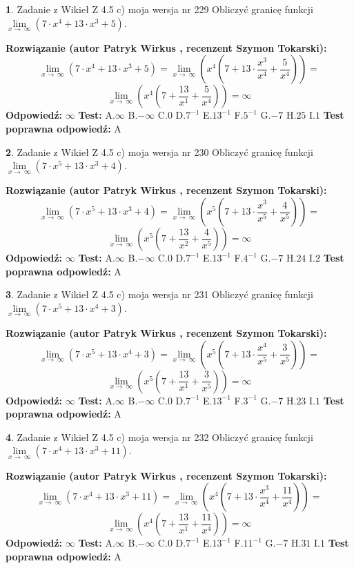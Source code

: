 \documentclass[12pt, a4paper]{article}
\theoremstyle{definition} %
\newtheorem{zad}{}
\newcommand{\zadStart}[1]{\begin{zad}#1\newline}
\newcommand{\zadStop}{\end{zad}}
\newcommand{\rozwStart}[2]{\noindent \textbf{Rozwiązanie (autor #1 , recenzent #2): }\newline}
\newcommand{\rozwStop}{\newline}
\newcommand{\odpStart}{\noindent \textbf{Odpowiedź:}\newline}
\newcommand{\odpStop}{\newline}
\newcommand{\testStart}{\noindent \textbf{Test:}\newline}
\newcommand{\testStop}{\newline}
\newcommand{\kluczStart}{\noindent \textbf{Test poprawna odpowiedź:}\newline}
\newcommand{\kluczStop}{\newline}
\begin{document}
\zadStart{Zadanie z Wikieł Z 4.5 c) moja wersja nr 229}
Obliczyć granicę funkcji  $\lim\limits_{x\to\ \infty}(7 \cdot x^{4}+13 \cdot x^{3}+5)$.
\zadStop
\rozwStart{Patryk Wirkus}{Szymon Tokarski}
$$\lim\limits_{x\to\ \infty}(7 \cdot x^{4}+13 \cdot x^{3}+5) = \lim\limits_{x\to\ \infty}(x^{4}(7 +13 \cdot \frac{x^{3}}{x^{4}}+\frac{5}{x^{4}})) =$$ $$\lim\limits_{x\to\ \infty}(x^{4}(7 +\frac{13}{x^{1}}+\frac{5}{x^{4}})) =\infty$$
\rozwStop
\odpStart
$\infty$
\odpStop
\testStart
A.$\infty$ B.$-\infty$ C.$0$ D.$7^{-1}$ E.$13^{-1}$
F.$5^{-1}$ G.$-7$
H.$25$
I.$1$
\testStop
\kluczStart
A
\kluczStop



\zadStart{Zadanie z Wikieł Z 4.5 c) moja wersja nr 230}
Obliczyć granicę funkcji  $\lim\limits_{x\to\ \infty}(7 \cdot x^{5}+13 \cdot x^{3}+4)$.
\zadStop
\rozwStart{Patryk Wirkus}{Szymon Tokarski}
$$\lim\limits_{x\to\ \infty}(7 \cdot x^{5}+13 \cdot x^{3}+4) = \lim\limits_{x\to\ \infty}(x^{5}(7 +13 \cdot \frac{x^{3}}{x^{5}}+\frac{4}{x^{5}})) =$$ $$\lim\limits_{x\to\ \infty}(x^{5}(7 +\frac{13}{x^{2}}+\frac{4}{x^{5}})) =\infty$$
\rozwStop
\odpStart
$\infty$
\odpStop
\testStart
A.$\infty$ B.$-\infty$ C.$0$ D.$7^{-1}$ E.$13^{-1}$
F.$4^{-1}$ G.$-7$
H.$24$
I.$2$
\testStop
\kluczStart
A
\kluczStop



\zadStart{Zadanie z Wikieł Z 4.5 c) moja wersja nr 231}
Obliczyć granicę funkcji  $\lim\limits_{x\to\ \infty}(7 \cdot x^{5}+13 \cdot x^{4}+3)$.
\zadStop
\rozwStart{Patryk Wirkus}{Szymon Tokarski}
$$\lim\limits_{x\to\ \infty}(7 \cdot x^{5}+13 \cdot x^{4}+3) = \lim\limits_{x\to\ \infty}(x^{5}(7 +13 \cdot \frac{x^{4}}{x^{5}}+\frac{3}{x^{5}})) =$$ $$\lim\limits_{x\to\ \infty}(x^{5}(7 +\frac{13}{x^{1}}+\frac{3}{x^{5}})) =\infty$$
\rozwStop
\odpStart
$\infty$
\odpStop
\testStart
A.$\infty$ B.$-\infty$ C.$0$ D.$7^{-1}$ E.$13^{-1}$
F.$3^{-1}$ G.$-7$
H.$23$
I.$1$
\testStop
\kluczStart
A
\kluczStop



\zadStart{Zadanie z Wikieł Z 4.5 c) moja wersja nr 232}
Obliczyć granicę funkcji  $\lim\limits_{x\to\ \infty}(7 \cdot x^{4}+13 \cdot x^{3}+11)$.
\zadStop
\rozwStart{Patryk Wirkus}{Szymon Tokarski}
$$\lim\limits_{x\to\ \infty}(7 \cdot x^{4}+13 \cdot x^{3}+11) = \lim\limits_{x\to\ \infty}(x^{4}(7 +13 \cdot \frac{x^{3}}{x^{4}}+\frac{11}{x^{4}})) =$$ $$\lim\limits_{x\to\ \infty}(x^{4}(7 +\frac{13}{x^{1}}+\frac{11}{x^{4}})) =\infty$$
\rozwStop
\odpStart
$\infty$
\odpStop
\testStart
A.$\infty$ B.$-\infty$ C.$0$ D.$7^{-1}$ E.$13^{-1}$
F.$11^{-1}$ G.$-7$
H.$31$
I.$1$
\testStop
\kluczStart
A
\kluczStop
\end{document}
